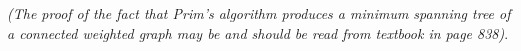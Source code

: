 \documentclass{article}
\begin{document}
\textit{(The proof of the fact that Prim’s algorithm produces a minimum spanning tree of a connected weighted graph may be and should be read from textbook in page 838)}.




\end{document}
